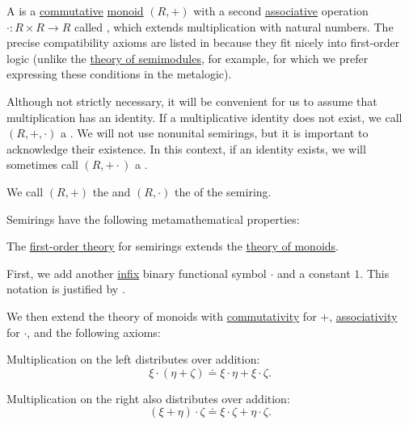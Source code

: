 \begin{definition}\label{def:semiring}
  A  is a \hyperref[def:magma/commutative]{commutative} \hyperref[def:monoid]{monoid} \( (R, +) \) with a second \hyperref[def:magma/associative]{associative} operation \( \cdot: R \times R \to R \) called , which extends multiplication with natural numbers. The precise compatibility axioms are listed in  because they fit nicely into first-order logic (unlike the \hyperref[def:semimodule/theory]{theory of semimodules}, for example, for which we prefer expressing these conditions in the metalogic).

  Although not strictly necessary, it will be convenient for us to assume that multiplication has an identity. If a multiplicative identity does not exist, we call \( (R, +, \cdot) \) a . We will not use nonunital semirings, but it is important to acknowledge their existence. In this context, if an identity exists, we will sometimes call \( (R, + \cdot) \) a .

  We call \( (R, +) \) the  and \( (R, \cdot) \) the  of the semiring.

  Semirings have the following metamathematical properties:
  \begin{thmenum}
     The \hyperref[def:first_order_theory]{first-order theory} for semirings extends the \hyperref[def:monoid/theory]{theory of monoids}.

    First, we add another \hyperref[rem:first_order_formula_conventions/infix]{infix} binary functional symbol \( \cdot \) and a constant \( 1 \). This notation is justified by .

    We then extend the theory of monoids with \hyperref[def:magma/commutative]{commutativity} for \( + \), \hyperref[def:magma/associative]{associativity} for \( \cdot \), and the following axioms:
    \begin{thmenum}
       Multiplication on the left distributes over addition:
      \begin{equation}\label{eq:def:semiring/left_distributivity}
        \xi \cdot (\eta + \zeta) \doteq \xi \cdot \eta + \xi \cdot \zeta.
      \end{equation}

       Multiplication on the right also distributes over addition:
      \begin{equation}\label{eq:def:semiring/right_distributivity}
        (\xi + \eta) \cdot \zeta \doteq \xi \cdot \zeta + \eta \cdot \zeta.
      \end{equation}


\end{thmenum}
\end{thmenum}
\end{definition}
